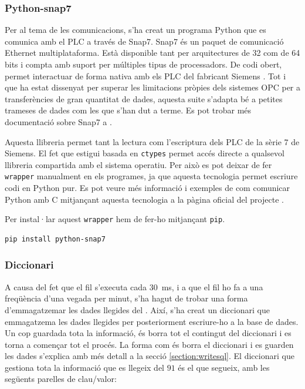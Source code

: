 \documentclass{tfgitic}[2022/06/30]
\begin{document}
\subsubsection{Python-snap7}
\label{section:snap7py}
Per al tema de les comunicacions, s'ha creat un programa Python que es comunica amb el PLC a través de Snap7. Snap7 és un paquet de comunicació Ethernet multiplataforma. Està disponible tant per arquitectures de 32 com de 64 bits i compta amb suport per múltiples tipus de processadors. De codi obert, permet interactuar de forma nativa amb els PLC del fabricant Siemens \cite{siemens:s7}. Tot i que ha estat dissenyat per superar les limitacions pròpies dels sistemes OPC per a transferències de gran quantitat de dades, aquesta suite s'adapta bé a petites trameses de dades com les que s'han dut a terme. Es pot trobar més documentació sobre Snap7 a \cite{snap7:documentation}.

Aquesta llibreria permet tant la lectura com l'escriptura dels PLC de la sèrie 7 de Siemens. El fet que estigui basada en \texttt{ctypes} permet accés directe a qualsevol llibreria compartida amb el sistema operatiu. Per això es pot deixar de fer \texttt{wrapper} manualment en els programes, ja que aquesta tecnologia permet escriure codi en Python pur. Es pot veure més informació i exemples de com comunicar Python amb C mitjançant aquesta tecnologia a la pàgina oficial del projecte \cite{snap7:python-snap7}. 

Per instal·lar aquest \texttt{wrapper} hem de fer-ho mitjançant \texttt{pip}.

\begin{lstlisting}[language=Bash]
pip install python-snap7
\end{lstlisting}

\subsubsection{Diccionari}
A causa del fet que el fil  s'executa cada \SI{30}{ms}, i a que el fil  ho fa a una freqüència d'una vegada per minut, s'ha hagut de trobar una forma d'emmagatzemar les dades llegides del . Així, s'ha creat un diccionari que emmagatzema les dades llegides per posteriorment escriure-ho a la base de dades. Un cop guardada tota la informació, és borra tot el contingut del diccionari i es torna a començar tot el procés. La forma com és borra el diccionari i es guarden les dades s'explica amb més detall a la secció \ref{section:writesql}. El diccionari que gestiona tota la informació que es llegeix del  $91$ és el que segueix, amb les següents parelles de clau/valor:
\end{document}
